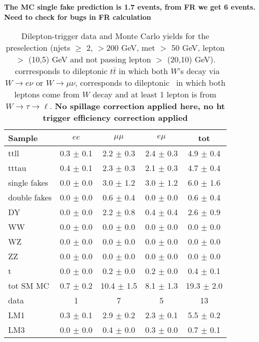 \begin{table}[htb]
\begin{center}
\caption{\label{tab:yields3} 
Dilepton-\Ht trigger data and Monte Carlo yields for the preselection 
(njets $\geq$ 2, \Ht$>$200 GeV, met $>$ 50 GeV, lepton \pt $>$ (10,5) GeV and not passing 
lepton \pt $>$ (20,10) GeV).
\ttll\ corrresponds  to dileptonic $t\bar{t}$ in which both $W$'s decay via $W\rightarrow e\nu$ or
$W\rightarrow \mu\nu$, \tttau corresponds to dileptonic \ttbar\ in which both leptons come from
$W$ decay and at least 1 lepton is from $W \to \tau \to \ell$. 
{\color{red} \bf No spillage correction applied here, no ht trigger efficiency correction applied} }
{\color{red} \bf The MC single fake prediction is 1.7 events, from FR we get 6 events. Need to check for bugs in FR calculation}
\begin{tabular}{l|cccc}

\hline
         Sample   &           $ee$   &       $\mu\mu$   &         $e\mu$   &            tot  \\
\hline
           ttll   &  0.3 $\pm$ 0.1   &  2.2 $\pm$ 0.3   &  2.4 $\pm$ 0.3   &  4.9 $\pm$ 0.4  \\
          tttau   &  0.4 $\pm$ 0.1   &  2.3 $\pm$ 0.3   &  2.1 $\pm$ 0.3   &  4.7 $\pm$ 0.4  \\
   single fakes   &  0.0 $\pm$ 0.0   &  3.0 $\pm$ 1.2   &  3.0 $\pm$ 1.2   &  6.0 $\pm$ 1.6  \\
   double fakes   &  0.0 $\pm$ 0.0   &  0.6 $\pm$ 0.4   &  0.0 $\pm$ 0.0   &  0.6 $\pm$ 0.4  \\
             DY   &  0.0 $\pm$ 0.0   &  2.2 $\pm$ 0.8   &  0.4 $\pm$ 0.4   &  2.6 $\pm$ 0.9  \\
             WW   &  0.0 $\pm$ 0.0   &  0.0 $\pm$ 0.0   &  0.0 $\pm$ 0.0   &  0.0 $\pm$ 0.0  \\
             WZ   &  0.0 $\pm$ 0.0   &  0.0 $\pm$ 0.0   &  0.0 $\pm$ 0.0   &  0.0 $\pm$ 0.0  \\
             ZZ   &  0.0 $\pm$ 0.0   &  0.0 $\pm$ 0.0   &  0.0 $\pm$ 0.0   &  0.0 $\pm$ 0.0  \\
              t   &  0.0 $\pm$ 0.0   &  0.2 $\pm$ 0.0   &  0.2 $\pm$ 0.0   &  0.4 $\pm$ 0.1  \\
\hline
      tot SM MC   &  0.7 $\pm$ 0.2   & 10.4 $\pm$ 1.5   &  8.1 $\pm$ 1.3   & 19.3 $\pm$ 2.0  \\
\hline
           data   &              1   &              7   &              5   &             13  \\
\hline
            LM1   &  0.3 $\pm$ 0.1   &  2.9 $\pm$ 0.2   &  2.3 $\pm$ 0.1   &  5.5 $\pm$ 0.2  \\
            LM3   &  0.0 $\pm$ 0.0   &  0.4 $\pm$ 0.0   &  0.3 $\pm$ 0.0   &  0.7 $\pm$ 0.1  \\
\hline
\end{tabular}
\end{center}
\end{table}

